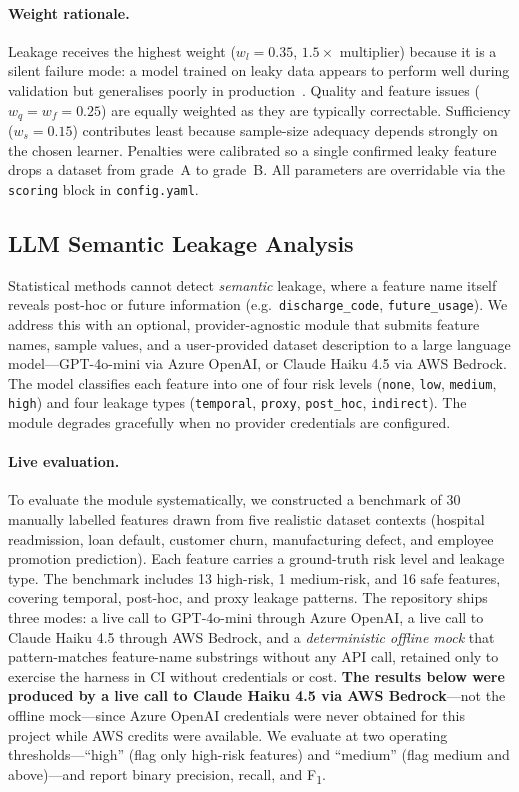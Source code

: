 \documentclass[11pt]{article}
\begin{document}
\paragraph{Weight rationale.}  Leakage receives the highest weight
($w_l{=}0.35$, $1.5\times$ multiplier) because it is a silent failure mode:
a model trained on leaky data appears to perform well during validation but
generalises poorly in production~\cite{kaufman2012leakage}.  Quality and
feature issues ($w_q{=}w_f{=}0.25$) are equally weighted as they are
typically correctable.  Sufficiency ($w_s{=}0.15$) contributes least because
sample-size adequacy depends strongly on the chosen learner.  Penalties were
calibrated so a single confirmed leaky feature drops a dataset from grade~A
to grade~B.  All parameters are overridable via the \texttt{scoring} block
in \texttt{config.yaml}.

\subsection{LLM Semantic Leakage Analysis}

Statistical methods cannot detect \emph{semantic} leakage, where a feature
name itself reveals post-hoc or future information
(e.g.\ \texttt{discharge\_code}, \texttt{future\_usage}).  We address this
with an optional, provider-agnostic module that submits feature names, sample values, and a
user-provided dataset description to a large language model---GPT-4o-mini via
Azure OpenAI, or Claude Haiku 4.5 via AWS Bedrock.  The model
classifies each feature into one of four risk levels (\texttt{none},
\texttt{low}, \texttt{medium}, \texttt{high}) and four leakage types
(\texttt{temporal}, \texttt{proxy}, \texttt{post\_hoc}, \texttt{indirect}).
The module degrades gracefully when no provider credentials are configured.

\paragraph{Live evaluation.}
To evaluate the module systematically, we constructed a benchmark of 30
manually labelled features drawn from five realistic dataset contexts
(hospital readmission, loan default, customer churn, manufacturing defect,
and employee promotion prediction).  Each feature carries a ground-truth
risk level and leakage type.  The benchmark includes 13 high-risk, 1
medium-risk, and 16 safe features, covering temporal, post-hoc, and proxy
leakage patterns.  The repository ships three modes: a live call to
GPT-4o-mini through Azure OpenAI, a live call to Claude Haiku 4.5 through AWS
Bedrock, and a \emph{deterministic offline mock} that pattern-matches
feature-name substrings without any API call, retained only to exercise the
harness in CI without credentials or cost.  \textbf{The results below were
produced by a live call to Claude Haiku 4.5 via AWS Bedrock}---not the
offline mock---since Azure OpenAI credentials were never obtained for this
project while AWS credits were available.  We evaluate at two operating
thresholds---``high'' (flag only high-risk features) and ``medium'' (flag
medium and above)---and report binary precision, recall, and
F\textsubscript{1}.
\end{document}

